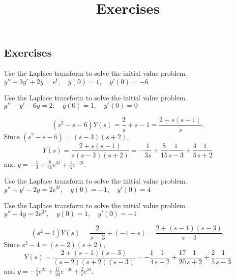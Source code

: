 \documentclass{ximera}
\title{Exercises} \license{CC BY-NC-SA 4.0}
\begin{document}
\begin{abstract}
\end{abstract}
\maketitle

\begin{onlineOnly}
\section*{Exercises}
\end{onlineOnly}



\begin{problem}\label{exer:8.3.1} Use the Laplace transform to solve the initial value problem. $y''+3y'+2y=e^t, \quad  y(0)=1,\quad y'(0)=-6$
\end{problem}

\begin{problem}\label{exer:8.3.2} Use the Laplace transform to solve the initial value problem. $y''-y'-6y=2, \quad  y(0)=1,\quad y'(0)=0$

\begin{solution}
$$
(s^2-s-6)Y(s)=\frac{2}{s}+s-1=\frac{2+s(s-1)}{s}.
$$
Since $(s^2-s-6)=(s-3)(s+2)$,
$$
Y(s)=\frac{2+s(s-1)}{s(s-3)(s+2)}
=-\frac{1}{3s}+\frac{8}{15}\frac{1}{s-3}+\frac{4}{5}\frac{1}{s+2}
$$
and $y=-\frac{1}{3}+\frac{8}{15}e^{3t}+\frac{4}{5}e^{-2t}$.
\end{solution}
\end{problem}

\begin{problem}\label{exer:8.3.3} Use the Laplace transform to solve the initial value problem. $y''+y'-2y=2e^{3t}, \quad  y(0)=-1,\quad y'(0)=4$
\end{problem}

\begin{problem}\label{exer:8.3.4} Use the Laplace transform to solve the initial value problem. $y''-4y=2 e^{3t}, \quad  y(0)=1,\quad y'(0)=-1$

\begin{solution}
$$
(s^2-4)Y(s)=\frac{2}{s-3}+(-1+s)=\frac{2+(s-1)(s-3)}{s-3}.
$$
Since $s^2-4=(s-2)(s+2)$,
$$
Y(s)=\frac{2+(s-1)(s-3)}{(s-2)(s+2)(s-3)}=
-\frac{1}{4}\frac{1}{s-2}+\frac{17}{20}\frac{1}{s+2}+\frac{2}{5}\frac{1}{s-3}
$$
and   $y=-\frac{1}{4}e^{2t}+\frac{17}{20}e^{-2t}+\frac{2}{5}e^{3t}$.
\end{solution}
\end{problem}
\end{document}
